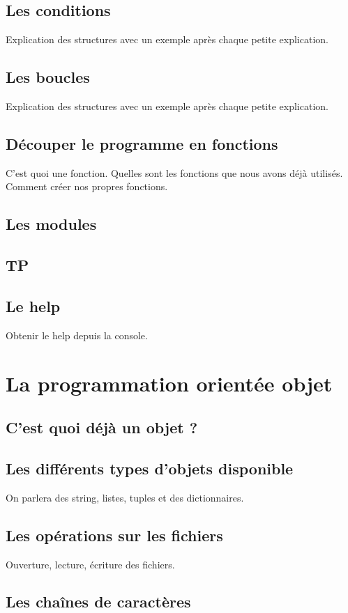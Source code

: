 \documentclass[12pt]{article}
\begin{document}
    \subsection{Les conditions}
        Explication des structures avec un exemple après chaque petite explication.
    \subsection{Les boucles}
        Explication des structures avec un exemple après chaque petite explication.
    \subsection{Découper le programme en fonctions}
        C'est quoi une fonction. Quelles sont les fonctions que nous avons déjà utilisés. Comment créer nos propres
        fonctions.
    \subsection{Les modules}
    \subsection{TP}
    \subsection{Le help}
        Obtenir le help depuis la console.

\section{La programmation orientée objet}
    \subsection{C'est quoi déjà un objet ?}
    \subsection{Les différents types d'objets disponible}
        On parlera des string, listes, tuples et des dictionnaires.
    \subsection{Les opérations sur les fichiers}
        Ouverture, lecture, écriture des fichiers.
    \subsection{Les chaînes de caractères}
\end{document}
